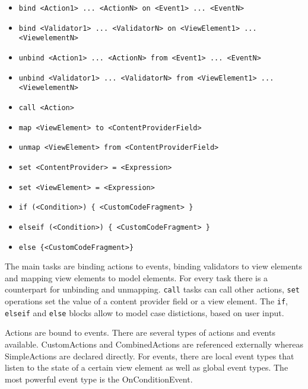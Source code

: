 \begin{itemize}
\item \lstinline!bind <Action1> ... <ActionN> on <Event1> ... <EventN>!
\item \lstinline!bind <Validator1> ... <ValidatorN> on <ViewElement1> ... <ViewelementN>!
\item \lstinline!unbind <Action1> ... <ActionN> from <Event1> ... <EventN>!
\item \lstinline!unbind <Validator1> ... <ValidatorN> from <ViewElement1> ... <ViewelementN>!
\item \lstinline!call <Action>!
\item \lstinline!map <ViewElement> to <ContentProviderField>!
\item \lstinline!unmap <ViewElement> from <ContentProviderField>!
\item \lstinline!set <ContentProvider> = <Expression>!
\item \lstinline!set <ViewElement> = <Expression>!
\item \lstinline!if (<Condition>) { <CustomCodeFragment> }!
\item \lstinline!elseif (<Condition>) { <CustomCodeFragment> }!
\item \lstinline!else {<CustomCodeFragment>}!
\end{itemize}

The main tasks are binding actions to events, binding validators to view elements and mapping view elements to model elements. For every task there is a counterpart for unbinding and unmapping. \lstinline!call! tasks can call other actions, \lstinline!set! operations set the value of a content provider field or a view element. The \lstinline!if!, \lstinline!elseif! and \lstinline!else! blocks allow to model case distictions, \eg based on user input.

Actions are bound to events. There are several types of actions and events available. CustomActions and CombinedActions are referenced externally whereas SimpleActions are declared directly. For events, there are local event types that listen to the state of a certain view element as well as global event types. The most powerful event type is the OnConditionEvent.

